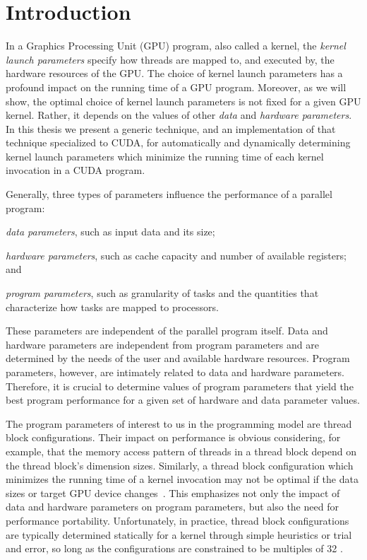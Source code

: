 \chapter{Introduction}
\label{ch:intro}


In a Graphics Processing Unit (GPU) program, 
also called a kernel, the \textit{kernel launch parameters}
specify how threads are mapped to,
and executed by, the hardware resources of the GPU. 
The choice of kernel launch parameters
has a profound impact on the running time
of a GPU program. 
Moreover, as we will show, 
the optimal choice of kernel launch parameters
is not fixed for a given GPU kernel. 
Rather, it depends on the values of other
\textit{data} and \textit{hardware parameters}.
In this thesis we present a generic technique, 
and an implementation of that technique specialized to CUDA, 
for automatically and dynamically determining 
kernel launch parameters
which minimize the running time of each kernel invocation in a CUDA program.

Generally, three types of parameters 
influence the performance of a parallel program: 
\begin{inparaenum}[(i)]
	\item {\em data parameters}, such as input data and its size;
	\item {\em hardware parameters}, such as cache capacity and number of 
	available registers; and
	\item {\em program parameters}, such as granularity of tasks and 
	the quantities that characterize how tasks are
	mapped to processors.
\end{inparaenum}
These parameters are independent of the parallel program itself.
Data and hardware parameters are independent from program parameters
and are determined by the needs of the user and available hardware
resources.  Program parameters, however, are intimately related to
data and hardware parameters. 
Therefore, it is crucial to determine values of program
parameters that yield the best program performance for a given set of
hardware and data parameter values.

The program parameters of interest to us 
in the {\cuda} programming model are thread block configurations. 
Their impact on performance is obvious 
considering, for example, that the memory access pattern of threads
in a thread block depend on the thread block's dimension sizes.
Similarly, a thread block configuration which 
minimizes the running time of a kernel invocation  
may not be optimal if the data sizes or target GPU device changes~\cite{DBLP:journals/tjs/TorresGL13}.
This emphasizes not only the impact of data and hardware parameters on program parameters, 
but also the need for performance portability.
Unfortunately, in practice, thread block configurations are typically 
determined statically for a kernel through simple heuristics or trial and error, 
so long as the configurations are constrained to be multiples of 32 \cite{cuda2016best}.


